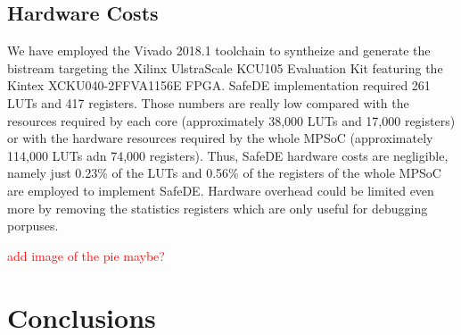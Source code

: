 \subsection{Hardware Costs}

We have employed the Vivado 2018.1 toolchain to syntheize and generate the bistream targeting the Xilinx UlstraScale KCU105 Evaluation Kit featuring the Kintex XCKU040-2FFVA1156E FPGA. SafeDE implementation required 261 LUTs and 417 registers. Those numbers are really low compared with the resources required by each core (approximately 38,000 LUTs and 17,000 registers) or with the hardware resources required by the whole MPSoC (approximately 114,000 LUTs adn 74,000 registers). Thus, SafeDE hardware costs are negligible, namely just 0.23\% of the LUTs and 0.56\% of the registers of the whole MPSoC are employed to implement SafeDE. Hardware overhead could be limited even more by removing the statistics registers which are only useful for debugging porpuses.

\textcolor{red}{add image of the pie maybe?}


\section{Conclusions}
